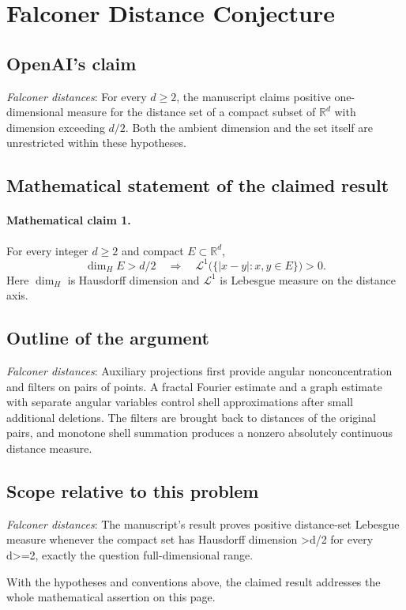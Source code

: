 \documentclass[11pt]{article}
\begin{document}
\section*{Falconer Distance Conjecture}

\subsection{OpenAI's claim}
\textit{Falconer distances}: For every $d\ge2$, the manuscript claims positive one-dimensional measure for the distance set of a compact subset of $\mathbb R^d$ with dimension exceeding $d/2$. Both the ambient dimension and the set itself are unrestricted within these hypotheses.

\subsection{Mathematical statement of the claimed result}
\paragraph{Mathematical claim 1.} For every integer $d\ge2$ and compact $E\subset\mathbb R^d$, \[\dim_H E>d/2\quad\Longrightarrow\quad\mathcal L^1\bigl(\{|x-y|:x,y\in E\}\bigr)>0.\] Here $\dim_H$ is Hausdorff dimension and $\mathcal L^1$ is Lebesgue measure on the distance axis.

\subsection{Outline of the argument}
\textit{Falconer distances}: Auxiliary projections first provide angular nonconcentration and filters on pairs of points. A fractal Fourier estimate and a graph estimate with separate angular variables control shell approximations after small additional deletions. The filters are brought back to distances of the original pairs, and monotone shell summation produces a nonzero absolutely continuous distance measure.

\subsection{Scope relative to this problem}
\textit{Falconer distances}: The manuscript’s result proves positive distance-set Lebesgue measure whenever the compact set has Hausdorff dimension >d/2 for every d>=2, exactly the question full-dimensional range.

With the hypotheses and conventions above, the claimed result addresses the whole mathematical assertion on this page.
\end{document}
